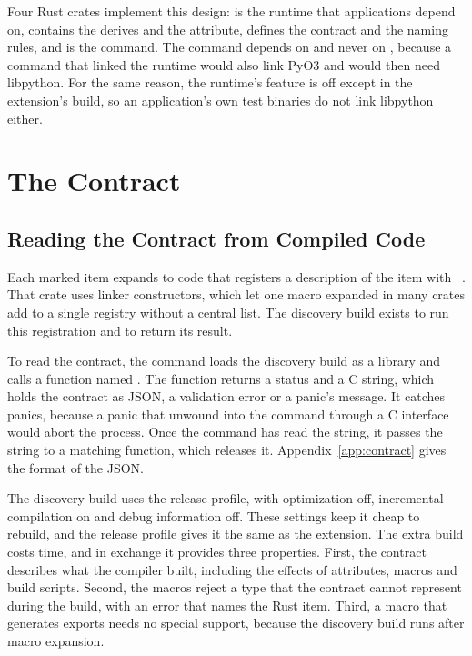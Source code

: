 \documentclass[sigconf,nonacm]{acmart}
\begin{document}
Four Rust crates implement this design:  is the runtime that applications depend on,  contains the derives and the  attribute,  defines the contract and the naming rules, and  is the command. The command depends on  and never on , because a command that linked the runtime would also link PyO3 and would then need libpython. For the same reason, the runtime's  feature is off except in the extension's build, so an application's own test binaries do not link libpython either.

\section{The Contract}
\label{sec:contract}

\subsection{Reading the Contract from Compiled Code}

Each marked item expands to code that registers a description of the item with ~\cite{inventory}. That crate uses linker constructors, which let one macro expanded in many crates add to a single registry without a central list. The discovery build exists to run this registration and to return its result.

To read the contract, the command loads the discovery build as a library and calls a function named . The function returns a status and a C string, which holds the contract as JSON, a validation error or a panic's message. It catches panics, because a panic that unwound into the command through a C interface would abort the process. Once the command has read the string, it passes the string to a matching  function, which releases it. Appendix~\ref{app:contract} gives the format of the JSON.

The discovery build uses the release profile, with optimization off, incremental compilation on and debug information off. These settings keep it cheap to rebuild, and the release profile gives it the same  as the extension. The extra build costs time, and in exchange it provides three properties. First, the contract describes what the compiler built, including the effects of  attributes, macros and build scripts. Second, the macros reject a type that the contract cannot represent during the build, with an error that names the Rust item. Third, a macro that generates exports needs no special support, because the discovery build runs after macro expansion.
\end{document}
